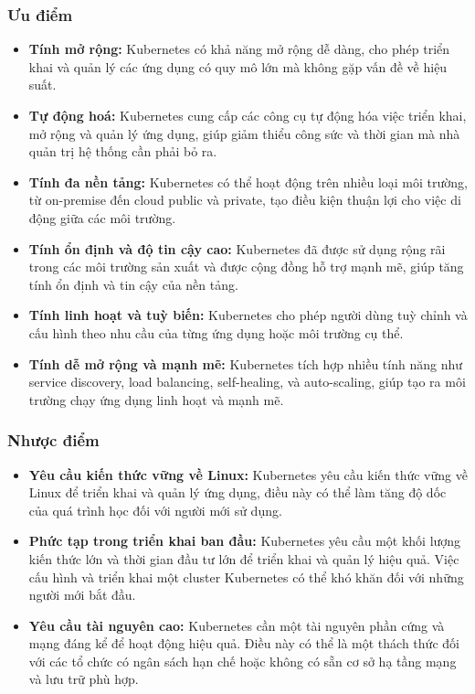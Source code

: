 \subsubsection{Ưu điểm}
\begin{itemize}
  \item \textbf{Tính mở rộng:} Kubernetes có khả năng mở rộng dễ dàng, cho phép triển khai và quản lý các ứng dụng có quy mô lớn mà không gặp vấn đề về hiệu suất.
  \item \textbf{Tự động hoá:} Kubernetes cung cấp các công cụ tự động hóa việc triển khai, mở rộng và quản lý ứng dụng, giúp giảm thiểu công sức và thời gian mà nhà quản trị hệ thống cần phải bỏ ra.
  \item \textbf{Tính đa nền tảng:} Kubernetes có thể hoạt động trên nhiều loại môi trường, từ on-premise đến cloud public và private, tạo điều kiện thuận lợi cho việc di động giữa các môi trường.
  \item \textbf{Tính ổn định và độ tin cậy cao:} Kubernetes đã được sử dụng rộng rãi trong các môi trường sản xuất và được cộng đồng hỗ trợ mạnh mẽ, giúp tăng tính ổn định và tin cậy của nền tảng.
  \item \textbf{Tính linh hoạt và tuỳ biến:} Kubernetes cho phép người dùng tuỳ chỉnh và cấu hình theo nhu cầu của từng ứng dụng hoặc môi trường cụ thể.
  \item \textbf{Tính dễ mở rộng và mạnh mẽ:} Kubernetes tích hợp nhiều tính năng như service discovery, load balancing, self-healing, và auto-scaling, giúp tạo ra môi trường chạy ứng dụng linh hoạt và mạnh mẽ.
\end{itemize}
\subsubsection{Nhược điểm}
\begin{itemize}
  \item \textbf{Yêu cầu kiến thức vững về Linux:} Kubernetes yêu cầu kiến thức vững về Linux để triển khai và quản lý ứng dụng, điều này có thể làm tăng độ dốc của quá trình học đối với người mới sử dụng.
  \item \textbf{Phức tạp trong triển khai ban đầu:} Kubernetes yêu cầu một khối lượng kiến thức lớn và thời gian đầu tư lớn để triển khai và quản lý hiệu quả. Việc cấu hình và triển khai một cluster Kubernetes có thể khó khăn đối với những người mới bắt đầu.
  \item \textbf{Yêu cầu tài nguyên cao:} Kubernetes cần một tài nguyên phần cứng và mạng đáng kể để hoạt động hiệu quả. Điều này có thể là một thách thức đối với các tổ chức có ngân sách hạn chế hoặc không có sẵn cơ sở hạ tầng mạng và lưu trữ phù hợp.
\end{itemize}
